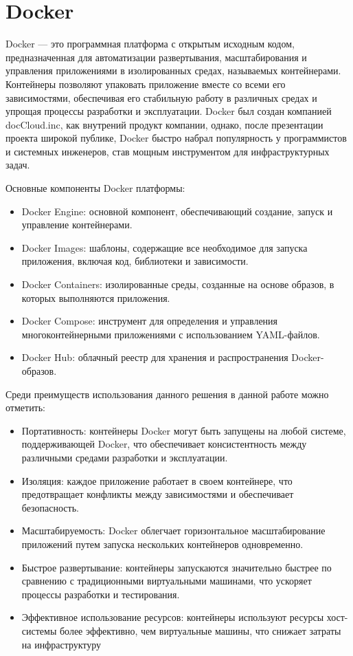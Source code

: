 \documentclass[a4paper, 14pt]{extreport}
\begin{document}
\section{Docker}
\par Docker — это программная платформа с открытым исходным кодом, предназначенная для автоматизации развертывания, масштабирования
 и управления приложениями в изолированных средах, называемых контейнерами. Контейнеры позволяют упаковать приложение вместе со 
 всеми его зависимостями, обеспечивая его стабильную работу в различных средах и упрощая процессы разработки и эксплуатации. 
 Docker был создан компанией docCloud.inc, как внутрений продукт компании, однако, после презентации проекта широкой публике,
 Docker быстро набрал популярность у программистов и системных инженеров, став мощным инструментом для инфраструктурных задач.
\par Основные компоненты Docker платформы:
\begin{itemize}
        \item Docker Engine: основной компонент, обеспечивающий создание, запуск и управление контейнерами.
        \item Docker Images: шаблоны, содержащие все необходимое для запуска приложения, включая код, библиотеки и зависимости.
        \item Docker Containers: изолированные среды, созданные на основе образов, в которых выполняются приложения.
        \item Docker Compose: инструмент для определения и управления многоконтейнерными приложениями с использованием YAML-файлов.
        \item Docker Hub: облачный реестр для хранения и распространения Docker-образов.​
\end{itemize}
\par Среди преимуществ использования данного решения в данной работе можно отметить:
\begin{itemize}
        \item Портативность: контейнеры Docker могут быть запущены на любой системе, поддерживающей Docker, что обеспечивает
              консистентность между различными средами разработки и эксплуатации.
        \item Изоляция: каждое приложение работает в своем контейнере, что предотвращает конфликты между зависимостями и
              обеспечивает безопасность.
        \item Масштабируемость: Docker облегчает горизонтальное масштабирование приложений путем запуска нескольких контейнеров одновременно.
        \item Быстрое развертывание: контейнеры запускаются значительно быстрее по сравнению с традиционными виртуальными машинами, что ускоряет
              процессы разработки и тестирования.
        \item Эффективное использование ресурсов: контейнеры используют ресурсы хост-системы более эффективно, чем виртуальные машины, что
              снижает затраты на инфраструктуру
\end{itemize}
\end{document}
